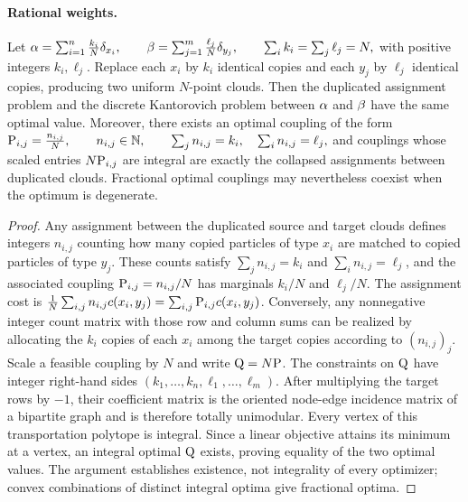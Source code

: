 \paragraph{Rational weights.}
\begin{proposition}\label{prop-rational-weights-duplicated-matching}
Let
\(\al=\sum_{i=1}^n \frac{k_i}{N}\delta_{x_i}, \qquad \be=\sum_{j=1}^m \frac{\ell_j}{N}\delta_{y_j}, \qquad \sum_i k_i=\sum_j\ell_j=N,\)
with positive integers $k_i,\ell_j$. Replace each $x_i$ by $k_i$ identical copies and each $y_j$ by $\ell_j$ identical copies, producing two uniform $N$-point clouds. Then the duplicated assignment problem and the discrete Kantorovich problem between $\al$ and $\be$ have the same optimal value. Moreover, there exists an optimal coupling of the form
\(\P_{i,j}=\frac{n_{i,j}}{N}, \qquad n_{i,j}\in\NN, \qquad \sum_j n_{i,j}=k_i, \quad \sum_i n_{i,j}=\ell_j,\)
and couplings whose scaled entries $N\P_{i,j}$ are integral are exactly the collapsed assignments between duplicated clouds. Fractional optimal couplings may nevertheless coexist when the optimum is degenerate.
\end{proposition}
\begin{proof}
Any assignment between the duplicated source and target clouds defines integers $n_{i,j}$ counting how many copied particles of type $x_i$ are matched to copied particles of type $y_j$. These counts satisfy $\sum_j n_{i,j}=k_i$ and $\sum_i n_{i,j}=\ell_j$, and the associated coupling $\P_{i,j}=n_{i,j}/N$ has marginals $k_i/N$ and $\ell_j/N$. The assignment cost is $\frac1N\sum_{i,j} n_{i,j}c(x_i,y_j)=\sum_{i,j}\P_{i,j}c(x_i,y_j)$.
Conversely, any nonnegative integer count matrix with those row and column sums can be realized by allocating the $k_i$ copies of each $x_i$ among the target copies according to $(n_{i,j})_j$. Scale a feasible coupling by $N$ and write $\Q=N\P$. The constraints on $\Q$ have integer right-hand sides $(k_1,\ldots,k_n,\ell_1,\ldots,\ell_m)$. After multiplying the target rows by $-1$, their coefficient matrix is the oriented node-edge incidence matrix of a bipartite graph and is therefore totally unimodular. Every vertex of this transportation polytope is integral. Since a linear objective attains its minimum at a vertex, an integral optimal $\Q$ exists, proving equality of the two optimal values. The argument establishes existence, not integrality of every optimizer; convex combinations of distinct integral optima give fractional optima.
\end{proof}
